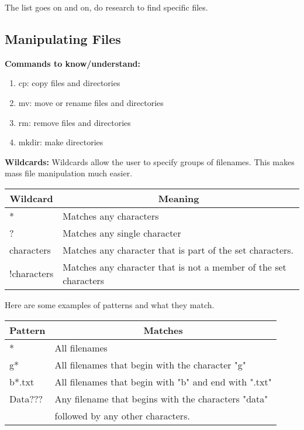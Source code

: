 \documentclass[12pt, letterpaper]{report}
\begin{document}
The list goes on and on, do research to find specific files.

\subsection{Manipulating Files}
\textbf{Commands to know/understand:}
\begin{enumerate}
	\item cp: copy files and directories
	\item mv: move or rename files and directories
	\item rm: remove files and directories
	\item mkdir: make directories
\end{enumerate}

\textbf{Wildcards:}
Wildcards allow the user to specify groups of filenames. This makes mass file
manipulation much easier.
\begin{center}
	\begin{tabular}[c]{l|l}
		\hline
		\multicolumn{1}{c|}{\textbf{Wildcard}} & 
		\multicolumn{1}{c}{\textbf{Meaning}} \\
		\hline
		\hline
		* & Matches any characters \\
		\hline
		? & Matches any single character \\
		\hline
		characters & Matches any character that is part of the set characters.\\
		\hline
		!characters & Matches any character that is not a member of the set characters\\
		\hline
	\end{tabular}
\end{center}

Here are some examples of patterns and what they match.
\begin{center}
	\begin{tabular}[c]{l|l}
		\hline
		\multicolumn{1}{c|}{\textbf{Pattern}} & 
		\multicolumn{1}{c}{\textbf{Matches}} \\
		\hline
		* & All filenames \\
		\hline
		g* & All filenames that begin with the character "g" \\
		\hline
		b*.txt & All filenames that begin with "b" and end with ".txt"\\
		\hline
		Data??? & Any filename that begins with the characters "data" \\&followed by any other characters.\\
		\hline
	\end{tabular}
\end{center}
\end{document}
